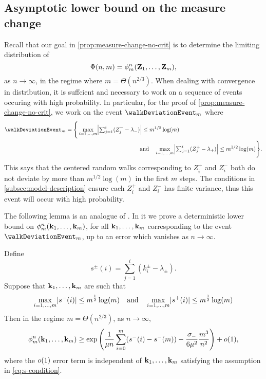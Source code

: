 \subsection{Asymptotic lower bound on the measure change}

Recall that our goal in \cref{prop:measure-change-no-crit} is to determine the limiting distribution of
\begin{equation*}
    \Phi(n, m) = \phi^n_m({\mathbf Z}_1, \ldots, {\mathbf Z}_m),
\end{equation*}
as $n \to \infty$, in the regime where $m = \Theta(n^{2/3})$. When dealing with convergence in distribution, it is suffcient and necessary to work on a sequence of events occuring with high probability. In particular, for the proof of \cref{prop:measure-change-no-crit}, we work on the event $\walkDeviationEvent_m$ where
\begin{align*}
    \walkDeviationEvent_m
    &= \Bigg\{ 
    \max_{i=1, \ldots, m } \abs*{
        \textstyle\sum_{j=1}^i (Z^{-}_j - \lambda_{-}) 
    } \leq m^{1/2} \log(m) \\
    &\hspace{13em} \text{and} \quad
    \max_{i=1, \ldots, m } \abs*{
        \textstyle\sum_{j=1}^i (Z^{+}_j - \lambda_{+}) 
    } \leq m^{1/2} \log(m)
    \Bigg\}.
\end{align*}
This says that the centered random walks corresponding to $Z^+_i$ and $Z^-_i$ both do not deviate by more than $m^{1/2} \log(m)$ in the first $m$ steps. The conditions in \cref{subsec:model-description} ensure each $Z^+_i$ and $Z^-_i$ has finite variance, thus this event will occur with high probability. 

The following lemma is an analogue of \citet[Lemma 6.7]{conchon--kerjanStableGraphMetric2021}. In it we prove a deterministic lower bound on $\phi^n_m({\mathbf k}_1, \ldots, {\mathbf k}_m)$, for all ${\mathbf k}_1, \ldots, {\mathbf k}_m$ corresponding to the event $\walkDeviationEvent_m$, up to an error which vanishes as $n \to \infty$.
\begin{proposition}
    \label{prop:measure-change-approx}
    Define
    \begin{equation*}
        s^{\pm}(i) = \textstyle{\sum_{j=1}^i (k_i^{\pm} - \lambda_{\pm})}.
    \end{equation*}
    Suppose that ${\mathbf k}_1, \ldots, {\mathbf k}_m$ are such that
    \begin{equation}
        \label{eq:s-condition}
        \max_{i=1, \ldots, m} \lvert s^{-}(i)\rvert \leq m^{\frac{1}{2}} \log(m)
        \quad \text{and} \quad
        \max_{i=1, \ldots, m} \lvert s^{+}(i)\rvert \leq m^{\frac{1}{2}} \log(m)
    \end{equation}
    Then in the regime $m = \Theta(n^{2/3})$, as $n \to \infty$,
    \begin{equation*}
        \phi^n_m({\mathbf k}_1, \ldots, {\mathbf k}_m)
        \geq \exp\left( \frac{1}{\mu n} \sum_{i=0}^m (s^-(i) - s^-(m)) - \frac{\sigma_-}{6 \mu^2} \frac{m^3}{n^2} \right) + o(1),
    \end{equation*}
    where the $o(1)$ error term is independent of ${\mathbf k}_1, \ldots, {\mathbf k}_m$ satisfying the assumption in \cref{eq:s-condition}.
\end{proposition}



